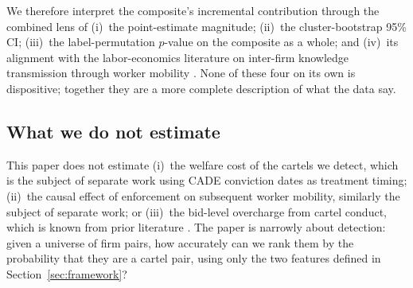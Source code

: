 We therefore interpret the composite's incremental contribution through the combined lens of (i)~the point-estimate magnitude; (ii)~the cluster-bootstrap 95\% CI; (iii)~the label-permutation $p$-value on the composite as a whole; and (iv)~its alignment with the labor-economics literature on inter-firm knowledge transmission through worker mobility \citep{stoyanov2012worker, jarosch2021learning}. None of these four on its own is dispositive; together they are a more complete description of what the data say.

\subsection{What we do not estimate}\label{sec:strategy_nonestimands}

This paper does not estimate (i)~the welfare cost of the cartels we detect, which is the subject of separate work using CADE conviction dates as treatment timing; (ii)~the causal effect of enforcement on subsequent worker mobility, similarly the subject of separate work; or (iii)~the bid-level overcharge from cartel conduct, which is known from prior literature \citep{connorbolotova2006}. The paper is narrowly about detection: given a universe of firm pairs, how accurately can we rank them by the probability that they are a cartel pair, using only the two features defined in Section~\ref{sec:framework}?
